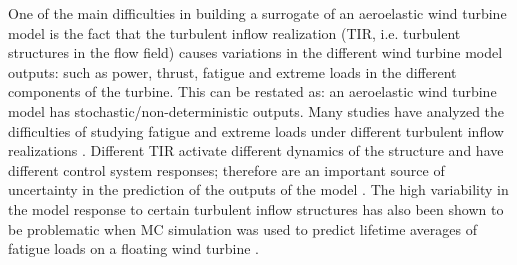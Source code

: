\documentclass[preprint,12pt]{elsarticle}
\begin{document}
One of the main difficulties in building a surrogate of an aeroelastic wind turbine model is the fact that the turbulent inflow realization (TIR, i.e. turbulent structures in the flow field) causes variations in the different wind turbine model outputs: such as power, thrust, fatigue and extreme loads in the different components of the turbine. This can be restated as: an aeroelastic wind turbine model has stochastic/non-deterministic outputs. Many studies have analyzed the difficulties of studying fatigue and extreme loads under different turbulent inflow realizations \cite{moriarty2008database, natarajan2012outlier, tibaldi2014investigation, abdallah2016influence, toft2016assessment}. Different TIR activate different dynamics of the structure and have different control system responses; therefore are an important source of uncertainty in the prediction of the outputs of the model \cite{moriarty2008database}. The high variability in the model response to certain turbulent inflow structures has also been shown to be problematic when MC simulation was used to predict lifetime averages of fatigue loads on a floating wind turbine \cite{graf2015high}.


\end{document}
